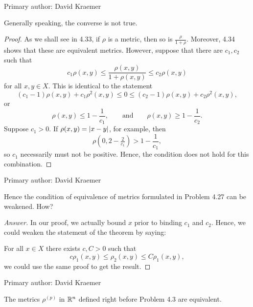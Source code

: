 Primary author: David Kraemer

\begin{minorEx}
    Generally speaking, the converse is not true.
\end{minorEx}

\begin{proof}
    As we shall see in 4.33, if $\rho$ is a metric, then so is $\frac{\rho}{1 +
    \rho}$. Moreover, 4.34 shows that these are equivalent metrics. However,
    suppose that there are $c_1, c_2$ such that 
    \[
        c_1 \rho(x, y) \leq
        \frac{\rho(x, y)}{1 + \rho(x, y)} \leq
        c_2 \rho(x, y)
    \]
    for all $x, y \in X$. This is identical to the statement
    \[
        (c_1 - 1) \rho(x, y) + c_1 \rho^2(x,y) \leq 0 \leq
        (c_2 - 1) \rho(x, y) + c_2 \rho^2(x,y),
    \]
    or
    \[
        \rho(x, y) \leq 1 - \frac{1}{c_1},
        \qquad \text{and} \qquad
        \rho(x, y) \geq 1 - \frac{1}{c_2}.
    \]
    Suppose $c_1 > 0$. If $\rho(x,y) = |x - y|$, for example, then
    \[
        \rho(0, 2 - \tfrac{2}{c_1}) > 1 - \frac{1}{c_1},
    \]
    so $c_1$ necessarily must not be positive. Hence, the condition does not
    hold for this combination.
\end{proof}

Primary author: David Kraemer
\begin{minorEx}
    [Riddle]
    Hence the condition of equivalence of metrics formulated in Problem 4.27 can
    be weakened. How?
\end{minorEx}

\begin{proof}
    [Answer]
    In our proof, we actually bound $x$ prior to binding $c_1$ and $c_2$. Hence,
    we could weaken the statement of the theorem by saying:

    For all $x \in X$ there exists $c, C > 0$ such that
    \[
        c \rho_1(x,y) \leq \rho_2(x,y) \leq C \rho_1(x,y),
    \]
    we could use the same proof to get the result.
\end{proof}

Primary author: David Kraemer

\begin{minorEx}
    The metrics $\rho^{(p)}$ in $\mathbb{R}^n$ defined right before Problem 4.3 are
    equivalent.
\end{minorEx}

